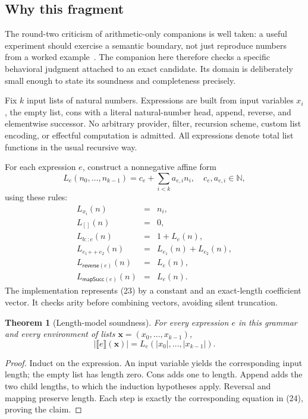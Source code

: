 \documentclass[11pt,letterpaper]{article}
\newcommand{\N}{\mathbb N}
\newcommand{\den}[1]{\llbracket #1\rrbracket}
\newtheorem{theorem}{Theorem}[section]
\theoremstyle{definition}
\theoremstyle{remark}
\begin{document}
\subsection{Why this fragment}
The round-two criticism of arithmetic-only companions is well taken: a useful
experiment should exercise a semantic boundary, not just reproduce numbers
from a worked example~\cite{B2}. The companion here therefore checks a specific
behavioral judgment attached to an exact candidate. Its domain is deliberately
small enough to state its soundness and completeness precisely.

Fix $k$ input lists of natural numbers. Expressions are built from input
variables $x_i$, the empty list, cons with a literal natural-number head,
append, reverse, and elementwise successor. No arbitrary provider, filter,
recursion scheme, custom list encoding, or effectful computation is admitted.
All expressions denote total list functions in the usual recursive way.

For each expression $e$, construct a nonnegative affine form
\[
L_e(n_0,\ldots,n_{k-1})=c_e+\sum_{i<k}a_{e,i}n_i,
\quad c_e,a_{e,i}\in\N,
\tag{23}
\]
using these rules:
\[
\begin{array}{rcl}
L_{x_i}(n)&=&n_i,\\
L_{[]}(n)&=&0,\\
L_{b::e}(n)&=&1+L_e(n),\\
L_{e_1\mathbin{++}e_2}(n)&=&L_{e_1}(n)+L_{e_2}(n),\\
L_{\mathsf{reverse}(e)}(n)&=&L_e(n),\\
L_{\mathsf{mapSucc}(e)}(n)&=&L_e(n).
\end{array}
\tag{24}
\]
The implementation represents (23) by a constant and an exact-length coefficient
vector. It checks arity before combining vectors, avoiding silent truncation.

\begin{theorem}[Length-model soundness]\label{thm:length}
For every expression $e$ in this grammar and every environment of lists
$\mathbf x=(x_0,\ldots,x_{k-1})$,
\[
|\den e(\mathbf x)|=L_e(|x_0|,\ldots,|x_{k-1}|).
\tag{25}
\]
\end{theorem}
\begin{proof}
Induct on the expression. An input variable yields the corresponding input
length; the empty list has length zero. Cons adds one to length. Append adds the
two child lengths, to which the induction hypotheses apply. Reversal and
mapping preserve length. Each step is exactly the corresponding equation in
(24), proving the claim.
\end{proof}
\end{document}
